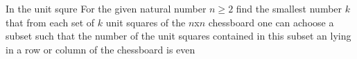 In the unit squre For the given natural number $n \geq 2$ find the smallest number $k$ that from each set of $k$ unit squares of the $n$x$n$ chessboard one can achoose a subset such that the number of the unit squares contained in this subset an lying in a row or column of the chessboard is even